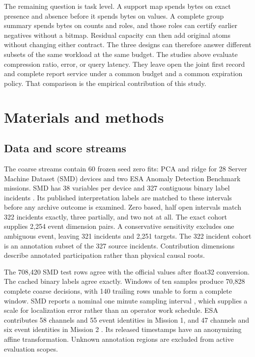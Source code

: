 \documentclass[a4paper,fleqn]{cas-dc}
\begin{document}
The remaining question is task level. A support map spends bytes on exact presence and absence before it spends bytes on values. A complete group summary spends bytes on counts and roles, and those roles can certify earlier negatives without a bitmap. Residual capacity can then add original atoms without changing either contract. The three designs can therefore answer different subsets of the same workload at the same budget. The studies above evaluate compression ratio, error, or query latency. They leave open the joint first record and complete report service under a common budget and a common expiration policy. That comparison is the empirical contribution of this study.

\section{Materials and methods}\label{sec:methods}

\subsection{Data and score streams}

The coarse streams contain 60 frozen seed zero fits: PCA and ridge for 28 Server Machine Dataset (SMD) devices and two ESA Anomaly Detection Benchmark missions. SMD has 38 variables per device and 327 contiguous binary label incidents \cite{Su2019Omni}. Its published interpretation labels are matched to these intervals before any archive outcome is examined. Zero based, half open intervals match 322 incidents exactly, three partially, and two not at all. The exact cohort supplies 2,254 event dimension pairs. A conservative sensitivity excludes one ambiguous event, leaving 321 incidents and 2,251 targets. The 322 incident cohort is an annotation subset of the 327 source incidents. Contribution dimensions describe annotated participation rather than physical causal roots.

The 708,420 SMD test rows agree with the official values after float32 conversion. The cached binary labels agree exactly. Windows of ten samples produce 70,828 complete coarse decisions, with 140 trailing rows unable to form a complete window. SMD reports a nominal one minute sampling interval \cite{Su2019Omni}, which supplies a scale for localization error rather than an operator work schedule. ESA contributes 58 channels and 55 event identities in Mission 1, and 47 channels and six event identities in Mission 2 \cite{DeCanio2025ESA,Kotowski2026ESA}. Its released timestamps have an anonymizing affine transformation. Unknown annotation regions are excluded from active evaluation scopes.
\end{document}
